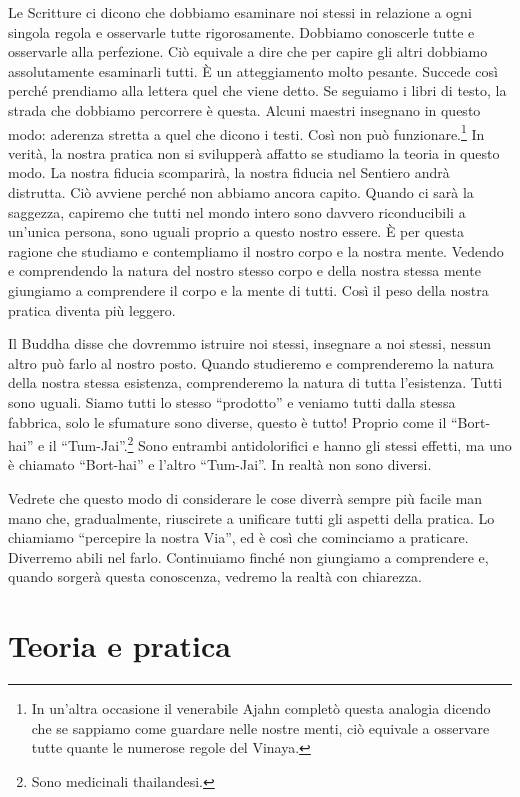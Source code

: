 Le Scritture ci dicono che dobbiamo esaminare noi stessi in relazione a
ogni singola regola e osservarle tutte rigorosamente. Dobbiamo
conoscerle tutte e osservarle alla perfezione. Ciò equivale a dire che
per capire gli altri dobbiamo assolutamente esaminarli tutti. È un
atteggiamento molto pesante. Succede così perché prendiamo alla lettera
quel che viene detto. Se seguiamo i libri di testo, la strada che
dobbiamo percorrere è questa. Alcuni maestri insegnano in questo modo:
aderenza stretta a quel che dicono i testi. Così non può
funzionare.\footnote{In un'altra occasione il venerabile Ajahn completò
  questa analogia dicendo che se sappiamo come guardare nelle nostre
  menti, ciò equivale a osservare tutte quante le numerose regole del
  Vinaya.} In verità, la nostra pratica non si svilupperà affatto se
studiamo la teoria in questo modo. La nostra fiducia scomparirà, la
nostra fiducia nel Sentiero andrà distrutta. Ciò avviene perché non
abbiamo ancora capito. Quando ci sarà la saggezza, capiremo che tutti
nel mondo intero sono davvero riconducibili a un'unica persona, sono
uguali proprio a questo nostro essere. È per questa ragione che studiamo
e contempliamo il nostro corpo e la nostra mente. Vedendo e comprendendo
la natura del nostro stesso corpo e della nostra stessa mente giungiamo
a comprendere il corpo e la mente di tutti. Così il peso della nostra
pratica diventa più leggero.

Il Buddha disse che dovremmo istruire noi stessi, insegnare a noi
stessi, nessun altro può farlo al nostro posto. Quando studieremo e
comprenderemo la natura della nostra stessa esistenza, comprenderemo la
natura di tutta l'esistenza. Tutti sono uguali. Siamo tutti lo stesso
``prodotto'' e veniamo tutti dalla stessa fabbrica, solo le sfumature
sono diverse, questo è tutto! Proprio come il ``Bort-hai'' e il
``Tum-Jai''.\footnote{Sono medicinali thailandesi.} Sono entrambi
antidolorifici e hanno gli stessi effetti, ma uno è chiamato
``Bort-hai'' e l'altro ``Tum-Jai''. In realtà non sono diversi.

Vedrete che questo modo di considerare le cose diverrà sempre più facile
man mano che, gradualmente, riuscirete a unificare tutti gli aspetti
della pratica. Lo chiamiamo ``percepire la nostra Via'', ed è così che
cominciamo a praticare. Diverremo abili nel farlo. Continuiamo finché
non giungiamo a comprendere e, quando sorgerà questa conoscenza, vedremo
la realtà con chiarezza.

\section{Teoria e pratica}

